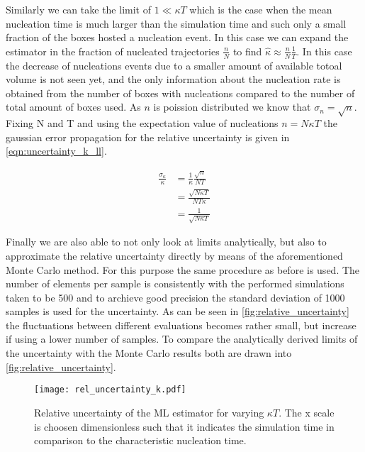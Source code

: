 Similarly we can take the limit of $1 \ll \kappa T$ which is the case when the mean nucleation time is much larger than the simulation time and such only a small fraction of the boxes hosted a nucleation event. In this case we can expand the estimator in the fraction of nucleated trajectories $\frac{n}{N}$ to find $\hat{\kappa} \approx \frac{n}{N} \frac{1}{T}$. In this case the decrease of nucleations events due to a smaller amount of available totoal volume is not seen yet, and the only information about the nucleation rate is obtained from the number of boxes with nucleations compared to the number of total amount of boxes used. As $n$ is poission distributed we know that $\sigma_n = \sqrt{n}$. Fixing N and T and using the expectation value of nucleations $n = N \kappa T$ the gaussian error propagation for the relative uncertainty is given in \autoref{eqn:uncertainty_k_ll}.

\begin{align}
\label{eqn:uncertainty_k_ll}
\frac{\sigma_{\kappa}}{\kappa} &= \frac{1}{\kappa} \frac{\sqrt{n}}{NT}\\
&=\frac{\sqrt{N \kappa T}}{N T \kappa}\\
&=\frac{1}{\sqrt{N \kappa T}}
\end{align}

Finally we are also able to not only look at limits analytically, but also to approximate the relative uncertainty directly by means of the aforementioned Monte Carlo method. For this purpose the same procedure as before is used. The number of elements per sample is consistently with the performed simulations taken to be 500 and to archieve good precision the standard deviation of 1000 samples is used for the uncertainty. As can be seen in \autoref{fig:relative_uncertainty} the fluctuations between different evaluations becomes rather small, but increase if using a lower number of samples. To compare the analytically derived limits of the uncertainty with the Monte Carlo results both are drawn into \autoref{fig:relative_uncertainty}.

\begin{figure}[h]
\begin{center}
\texttt{[image: rel\_uncertainty\_k.pdf]}
\caption{Relative uncertainty of the ML estimator for varying $\kappa T$. The x scale is choosen dimensionless such that it indicates the simulation time in comparison to the characteristic nucleation time.}
\label{fig:relative_uncertainty}
\end{center}
\end{figure}

